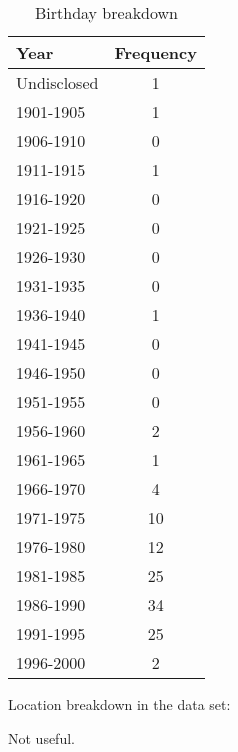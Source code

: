 \begin{table}[!htbp]
\centering
	\begin{tabular}{|l|c|} %
		\hline
		\textbf{Year} & \textbf{Frequency}  \\ \hline
		Undisclosed & 1 \\ \hline
		1901-1905 & 1 \\ \hline
		1906-1910 & 0 \\ \hline
		1911-1915 & 1 \\ \hline
		1916-1920 & 0 \\ \hline
		1921-1925 & 0 \\ \hline
		1926-1930 & 0 \\ \hline
		1931-1935 & 0 \\ \hline
		1936-1940 & 1 \\ \hline
		1941-1945 & 0 \\ \hline
		1946-1950 & 0 \\ \hline
		1951-1955 & 0 \\ \hline
		1956-1960 & 2 \\ \hline
		1961-1965 & 1 \\ \hline
		1966-1970 & 4 \\ \hline
		1971-1975 & 10 \\ \hline
		1976-1980 & 12 \\ \hline
		1981-1985 & 25 \\ \hline
		1986-1990 & 34 \\ \hline
		1991-1995 & 25 \\ \hline
		1996-2000 & 2 \\ \hline
	\end{tabular}
	\caption{Birthday breakdown}
	\label{tab:revpol}
\end{table}

\clearpage

Location breakdown in the data set:

Not useful.

